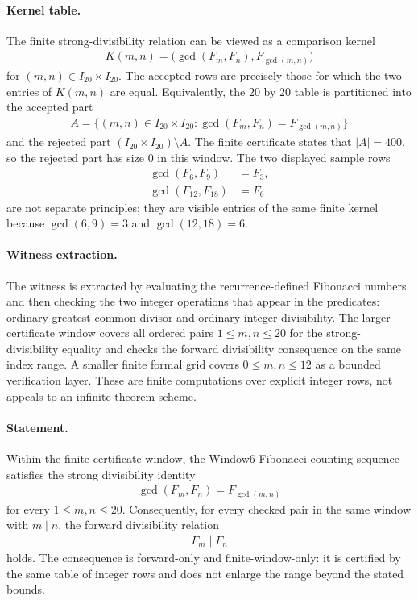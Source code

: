 \paragraph{Kernel table.}
The finite strong-divisibility relation can be viewed as a comparison kernel
$$
\begin{aligned}
K(m,n)=\bigl(\gcd(F_m,F_n),F_{\gcd(m,n)}\bigr)
\end{aligned}
$$
for $(m,n)\in I_{20}\times I_{20}$. The accepted rows are precisely those for which the two entries of $K(m,n)$ are equal. Equivalently, the $20$ by $20$ table is partitioned into the accepted part
$$
\begin{aligned}
A=\{(m,n)\in I_{20}\times I_{20}:\gcd(F_m,F_n)=F_{\gcd(m,n)}\}
\end{aligned}
$$
and the rejected part $(I_{20}\times I_{20})\setminus A$. The finite certificate states that $|A|=400$, so the rejected part has size $0$ in this window. The two displayed sample rows
$$
\begin{aligned}
\gcd(F_6,F_9)&=F_3,\\
\gcd(F_{12},F_{18})&=F_6
\end{aligned}
$$
are not separate principles; they are visible entries of the same finite kernel because $\gcd(6,9)=3$ and $\gcd(12,18)=6$.

\paragraph{Witness extraction.}
The witness is extracted by evaluating the recurrence-defined Fibonacci numbers and then checking the two integer operations that appear in the predicates: ordinary greatest common divisor and ordinary integer divisibility. The larger certificate window covers all ordered pairs $1\leq m,n\leq 20$ for the strong-divisibility equality and checks the forward divisibility consequence on the same index range. A smaller finite formal grid covers $0\leq m,n\leq 12$ as a bounded verification layer. These are finite computations over explicit integer rows, not appeals to an infinite theorem scheme.

\paragraph{Statement.}
Within the finite certificate window, the Window6 Fibonacci counting sequence satisfies the strong divisibility identity
$$
\begin{aligned}
\gcd(F_m,F_n)=F_{\gcd(m,n)}
\end{aligned}
$$
for every $1\leq m,n\leq 20$. Consequently, for every checked pair in the same window with $m\mid n$, the forward divisibility relation
$$
\begin{aligned}
F_m\mid F_n
\end{aligned}
$$
holds. The consequence is forward-only and finite-window-only: it is certified by the same table of integer rows and does not enlarge the range beyond the stated bounds.

